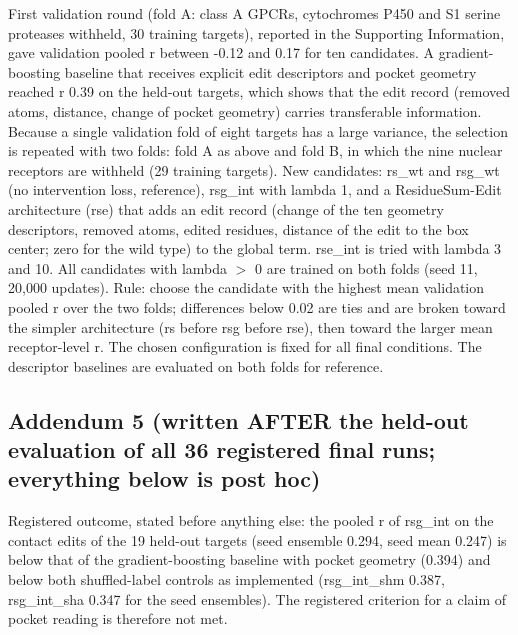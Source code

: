 First validation round (fold A: class A GPCRs, cytochromes P450 and S1 serine proteases withheld, 30 training targets), reported in the Supporting Information, gave validation pooled r between -0.12 and 0.17 for ten candidates. A gradient-boosting baseline that receives explicit edit descriptors and pocket geometry reached r 0.39 on the held-out targets, which shows that the edit record (removed atoms, distance, change of pocket geometry) carries transferable information. Because a single validation fold of eight targets has a large variance, the selection is repeated with two folds: fold A as above and fold B, in which the nine nuclear receptors are withheld (29 training targets). New candidates: rs\_wt and rsg\_wt (no intervention loss, reference), rsg\_int with lambda 1, and a ResidueSum-Edit architecture (rse) that adds an edit record (change of the ten geometry descriptors, removed atoms, edited residues, distance of the edit to the box center; zero for the wild type) to the global term. rse\_int is tried with lambda 3 and 10. All candidates with lambda $>$ 0 are trained on both folds (seed 11, 20,000 updates). Rule: choose the candidate with the highest mean validation pooled r over the two folds; differences below 0.02 are ties and are broken toward the simpler architecture (rs before rsg before rse), then toward the larger mean receptor-level r. The chosen configuration is fixed for all final conditions. The descriptor baselines are evaluated on both folds for reference.

\subsection*{Addendum 5 (written AFTER the held-out evaluation of all 36 registered final runs; everything below is post hoc)}

Registered outcome, stated before anything else: the pooled r of rsg\_int on the contact edits of the 19 held-out targets (seed ensemble 0.294, seed mean 0.247) is below that of the gradient-boosting baseline with pocket geometry (0.394) and below both shuffled-label controls as implemented (rsg\_int\_shm 0.387, rsg\_int\_sha 0.347 for the seed ensembles). The registered criterion for a claim of pocket reading is therefore not met.

